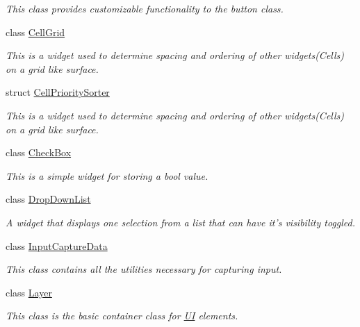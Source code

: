 \begin{DoxyCompactItemize}
\begin{DoxyCompactList}\small\item\em This class provides customizable functionality to the button class. \item\end{DoxyCompactList}\item 
class \hyperlink{classMezzanine_1_1UI_1_1CellGrid}{CellGrid}
\begin{DoxyCompactList}\small\item\em This is a widget used to determine spacing and ordering of other widgets(Cells) on a grid like surface. \item\end{DoxyCompactList}\item 
struct \hyperlink{structMezzanine_1_1UI_1_1CellPrioritySorter}{CellPrioritySorter}
\begin{DoxyCompactList}\small\item\em This is a widget used to determine spacing and ordering of other widgets(Cells) on a grid like surface. \item\end{DoxyCompactList}\item 
class \hyperlink{classMezzanine_1_1UI_1_1CheckBox}{CheckBox}
\begin{DoxyCompactList}\small\item\em This is a simple widget for storing a bool value. \item\end{DoxyCompactList}\item 
class \hyperlink{classMezzanine_1_1UI_1_1DropDownList}{DropDownList}
\begin{DoxyCompactList}\small\item\em A widget that displays one selection from a list that can have it's visibility toggled. \item\end{DoxyCompactList}\item 
class \hyperlink{classMezzanine_1_1UI_1_1InputCaptureData}{InputCaptureData}
\begin{DoxyCompactList}\small\item\em This class contains all the utilities necessary for capturing input. \item\end{DoxyCompactList}\item 
class \hyperlink{classMezzanine_1_1UI_1_1Layer}{Layer}
\begin{DoxyCompactList}\small\item\em This class is the basic container class for \hyperlink{namespaceMezzanine_1_1UI}{UI} elements. \item\end{DoxyCompactList}\item 

\end{DoxyCompactItemize}
